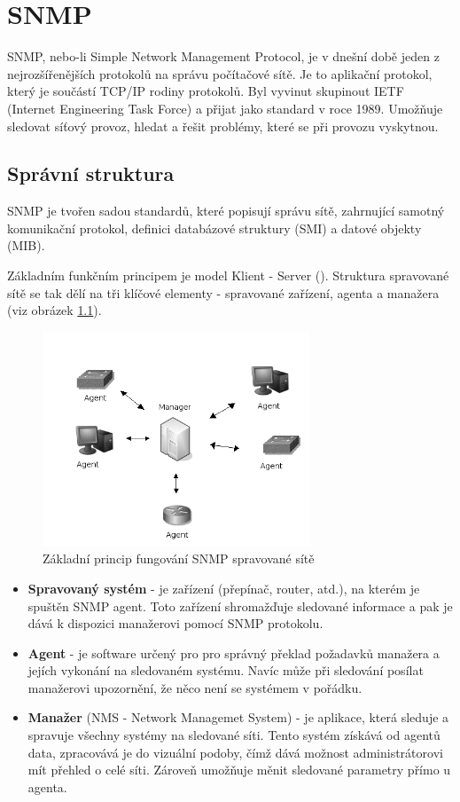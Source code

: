\chapter{SNMP}
\label{kap_snmp}
SNMP, nebo-li Simple Network Management Protocol, je v dnešní době jeden z nejrozšířenějších protokolů na správu počítačové sítě. Je to aplikační protokol, který je součástí TCP/IP rodiny protokolů. 
Byl vyvinut skupinout IETF (Internet Engineering Task Force) a přijat jako standard v roce 1989. Umožňuje sledovat síťový provoz, hledat a řešit problémy, které se při provozu vyskytnou. 

\section{Správní struktura}
SNMP je tvořen sadou standardů, které popisují správu sítě, zahrnující samotný komunikační protokol, definici databázové struktury (SMI) a datové objekty (MIB).

Základním funkčním principem je model Klient - Server (\cite{cisco_snmp}). Struktura spravované sítě se tak dělí na tři klíčové elementy - spravované zařízení, agenta a manažera (viz obrázek \ref{obr_snmp1}).

\begin{figure}[htp]
	\begin{center}
		\includegraphics[width=8cm]{obrazky/02_snmp_principle.png}
		\caption{Základní princip fungování SNMP spravované sítě}
		\label{obr_snmp1}
	\end{center}
\end{figure}

\begin{itemize}
	\item \textbf{Spravovaný systém} - je zařízení (přepínač, router, atd.), na kterém je spuštěn SNMP agent. Toto zařízení shromažďuje sledované informace a pak je
	dává k dispozici manažerovi pomocí SNMP protokolu.
	\item \textbf{Agent} - je software určený pro pro správný překlad požadavků manažera a jejích vykonání na sledovaném systému. Navíc může při sledování posílat manažerovi 
	upozornění, že něco není se systémem v pořádku.
	\item \textbf{Manažer} (NMS - Network Managemet System) - je aplikace, která sleduje a spravuje všechny systémy na sledované síti. Tento systém získává od agentů data, zpracovává je do vizuální podoby, 
	čímž dává možnost administrátorovi mít přehled o celé síti. Zároveň umožňuje měnit sledované parametry přímo u agenta.
\end{itemize}

